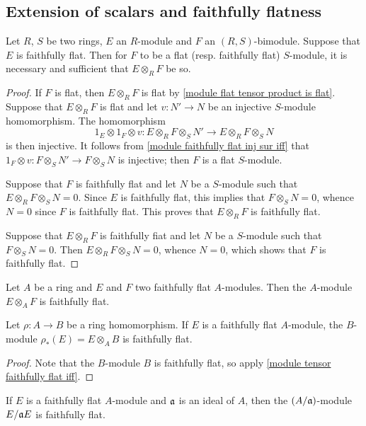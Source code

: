 \subsection{Extension of scalars and faithfully flatness}
\begin{proposition}\label{module tensor faithfully flat iff}
Let $R$, $S$ be two rings, $E$ an $R$-module and $F$ an $(R,S)$-bimodule. Suppose that $E$ is faithfully flat. Then for $F$ to be a flat (resp. faithfully flat) $S$-module, it is necessary and sufficient that $E\otimes_RF$ be so.
\end{proposition}
\begin{proof}
If $F$ is flat, then $E\otimes_RF$ is flat by \cref{module flat tensor product is flat}. Suppose that $E\otimes_RF$ is flat and let $v:N'\to N$ be an injective $S$-module homomorphism. The homomorphism
\[1_E\otimes 1_F\otimes v:E\otimes_RF\otimes_SN'\to E\otimes_RF\otimes_SN\]
is then injective. It follows from \cref{module faithfully flat inj sur iff} that $1_F\otimes v:F\otimes_SN'\to F\otimes_SN$ is injective; then $F$ is a flat $S$-module.\par
Suppose that $F$ is faithfully flat and let $N$ be a $S$-module such that $E\otimes_RF\otimes_SN=0$. Since $E$ is faithfully flat, this implies that $F\otimes_SN=0$, whence $N=0$ since $F$ is faithfully flat. This proves that $E\otimes_RF$ is faithfully flat.\par
Suppose that $E\otimes_RF$ is faithfully fiat and let $N$ be a $S$-module such that $F\otimes_SN=0$. Then $E\otimes_RF\otimes_SN=0$, whence $N=0$, which shows that $F$ is faithfully flat.
\end{proof}
\begin{corollary}
Let $A$ be a ring and $E$ and $F$ two faithfully flat $A$-modules. Then the $A$-module $E\otimes_AF$ is faithfully flat.
\end{corollary}
\begin{proposition}\label{module faithfully flat extension}
Let $\rho:A\to B$ be a ring homomorphism. If $E$ is a faithfully flat $A$-module, the $B$-module $\rho_*(E)=E\otimes_AB$ is faithfully flat.
\end{proposition}
\begin{proof}
Note that the $B$-module $B$ is faithfully flat, so apply \cref{module tensor faithfully flat iff}.
\end{proof}
\begin{corollary}\label{module faithfully flat extension to quotient ring}
If $E$ is a faithfully flat $A$-module and $\mathfrak{a}$ is an ideal of $A$, then the $(A/\mathfrak{a})$-module $E/\mathfrak{a} E$ is faithfully flat.
\end{corollary}
